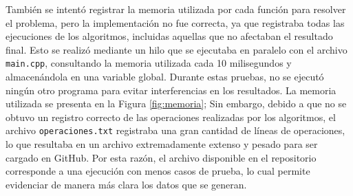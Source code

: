 También se intentó registrar la memoria utilizada por cada función para resolver el problema, pero la implementación no fue correcta, ya que registraba todas las ejecuciones de los algoritmos, incluidas aquellas que no afectaban el resultado final. Esto se realizó mediante un hilo que se ejecutaba en paralelo con el archivo \texttt{main.cpp}, consultando la memoria utilizada cada 10 milisegundos y almacenándola en una variable global. Durante estas pruebas, no se ejecutó ningún otro programa para evitar interferencias en los resultados. La memoria utilizada se presenta en la Figura \ref{fig:memoria}; Sin embargo, debido a que no se obtuvo un registro correcto de las operaciones realizadas por los algoritmos, el archivo \texttt{operaciones.txt} registraba una gran cantidad de líneas de operaciones, lo que resultaba en un archivo extremadamente extenso y pesado para ser cargado en GitHub. Por esta razón, el archivo disponible en el repositorio corresponde a una ejecución con menos casos de prueba, lo cual permite evidenciar de manera más clara los datos que se generan.


